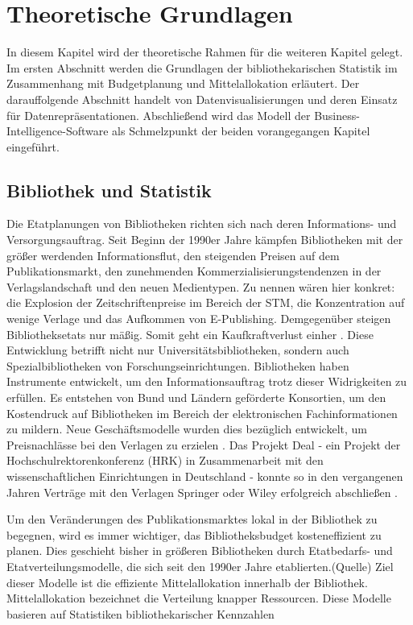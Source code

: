 \chapter{Theoretische Grundlagen}
\label{chap:two}
In diesem Kapitel wird der theoretische Rahmen für die weiteren Kapitel gelegt. Im
ersten Abschnitt werden die Grundlagen der bibliothekarischen Statistik im Zusammenhang mit Budgetplanung
und Mittelallokation erläutert. Der darauffolgende Abschnitt handelt von Datenvisualisierungen und deren Einsatz
für Datenrepräsentationen. Abschließend wird das Modell der Business-Intelligence-Software als Schmelzpunkt der 
beiden vorangegangen Kapitel eingeführt.

\section{Bibliothek und Statistik}
\label{chap:two_one}
Die Etatplanungen von Bibliotheken richten sich nach deren Informations- und Versorgungsauftrag. 
Seit Beginn der 1990er Jahre kämpfen Bibliotheken mit der größer werdenden Informationsflut, den steigenden Preisen auf dem Publikationsmarkt, 
den zunehmenden Kommerzialisierungstendenzen in der Verlagslandschaft und den neuen Medientypen. 
Zu nennen wären hier konkret: die Explosion der Zeitschriftenpreise im Bereich der \acrfull{STM}, die Konzentration auf wenige Verlage und
das Aufkommen von E-Publishing. Demgegenüber steigen Bibliotheksetats nur mäßig. 
Somit geht ein Kaufkraftverlust einher \cite[vgl.][161]{moravetz-kuhlmann_monika_erwerbungspolitik_2015}.
Diese Entwicklung betrifft nicht nur Universitätsbibliotheken, sondern auch Spezialbibliotheken von Forschungseinrichtungen.
Bibliotheken haben Instrumente entwickelt, um den Informationsauftrag trotz dieser Widrigkeiten zu erfüllen.
Es entstehen von Bund und Ländern geförderte Konsortien, um den Kostendruck auf Bibliotheken im Bereich der elektronischen
Fachinformationen zu mildern. Neue Geschäftsmodelle wurden dies bezüglich entwickelt, um Preisnachlässe bei den Verlagen zu erzielen
\cite[vgl.][169 ff.]{moravetz-kuhlmann_monika_erwerbungspolitik_2015}. Das Projekt Deal - ein Projekt der Hochschulrektorenkonferenz (HRK) in Zusammenarbeit mit den
wissenschaftlichen Einrichtungen in Deutschland - konnte so in den vergangenen Jahren Verträge mit den Verlagen Springer oder Wiley erfolgreich abschließen \cite[vgl.][]{projekt_deal_projekt_2020}.

Um den Veränderungen des Publikationsmarktes lokal in der Bibliothek zu begegnen, wird es immer wichtiger, das Bibliotheksbudget kosteneffizient zu planen. 
Dies geschieht bisher in größeren Bibliotheken durch Etatbedarfs- und Etatverteilungsmodelle, die sich seit den 1990er Jahre etablierten.(Quelle) 
Ziel dieser Modelle ist die effiziente Mittelallokation 
innerhalb der Bibliothek. Mittelallokation bezeichnet die Verteilung knapper Ressourcen. Diese Modelle basieren auf Statistiken bibliothekarischer Kennzahlen \cite[vgl.][172 ff.]{moravetz-kuhlmann_monika_erwerbungspolitik_2015}

